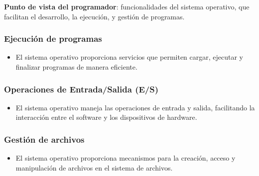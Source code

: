 \begin{tcolorbox}
\textbf{Punto de vista del programador}:	funcionalidades del sistema operativo, que facilitan el desarrollo, la ejecución, y gestión de programas.

\subsubsection{Ejecución de programas}
\begin{itemize}
	\item El sistema operativo proporciona servicios que permiten cargar, ejecutar y finalizar programas de manera eficiente.
\end{itemize}

\subsubsection{Operaciones de Entrada/Salida (E/S)}
\begin{itemize}
	\item El sistema operativo maneja las operaciones de entrada y salida, facilitando la interacción entre el software y los dispositivos de hardware.
\end{itemize}

\subsubsection{Gestión de archivos}
\begin{itemize}
	\item El sistema operativo proporciona mecanismos para la creación, acceso y manipulación de archivos en el sistema de archivos.
\end{itemize}

\end{tcolorbox}


